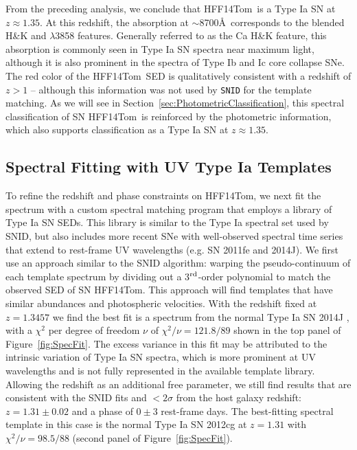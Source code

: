 \documentclass[iop]{emulateapj}
\def\tomas{HFF14Tom}
\newcommand{\CCSNe}{core collapse SNe}
\begin{document}
From the preceding analysis, we conclude that \tomas\ is a Type Ia SN
at $z\approx1.35$.  At this redshift, the absorption at $\sim$8700\AA\
corresponds to the blended  H\&K and  $\lambda$3858 features.  Generally referred to as the Ca H\&K feature, this absorption is commonly seen in Type Ia SN spectra
near maximum light, although it is also prominent in the spectra of
Type Ib and Ic \CCSNe.  The red color of
the \tomas\ SED is qualitatively consistent with a redshift of $z>1$
-- although this information was not used by {\tt SNID} for the
template matching.  As we will see in
Section~\ref{sec:PhotometricClassification}, this spectral
classification of SN \tomas\ is reinforced by the photometric
information, which also supports classification as a Type Ia SN at
$z\approx1.35$.


\subsection{Spectral Fitting with UV Type Ia Templates}
\label{sec:SpecRedshift}

To refine the redshift and phase constraints on \tomas, we next fit
the spectrum with a custom spectral matching program that employs a
library of Type Ia SN SEDs.  This library is similar to the Type Ia
spectral set used by SNID, but also includes more recent SNe with
well-observed spectral time series that extend to rest-frame UV
wavelengths (e.g. SN 2011fe and 2014J).  We first use an approach
similar to the SNID algorithm: warping the pseudo-continuum of each
template spectrum by dividing out a 3$^{\rm rd}$-order polynomial to
match the observed SED of SN \tomas.  This approach will find
templates that have similar abundances and photospheric
velocities. With the redshift fixed at $z=1.3457$ we find the best fit
is a spectrum from the normal Type Ia SN 2014J \citep{Foley:2014},
with a $\chi^2$ per degree of freedom $\nu$ of $\chi^2/\nu=121.8/89$
shown in the top panel of Figure~\ref{fig:SpecFit}. The excess
variance in this fit may be attributed to the intrinsic variation of
Type Ia SN spectra, which is more prominent at UV
wavelengths \citep[e.g.][]{Foley:2008b,Wang:2012} and is not fully
represented in the available template library.  Allowing the redshift
as an additional free parameter, we still find results that are
consistent with the SNID fits and $<2\sigma$ from the host galaxy
redshift: $z=1.31\pm0.02$ and a phase of $0\pm3$ rest-frame days. The
best-fitting spectral template in this case is the normal Type Ia SN
2012cg \citep{Amanullah:2015} at $z=1.31$ with $\chi^2/\nu=98.5/88$
(second panel of Figure~\ref{fig:SpecFit}).
\end{document}
